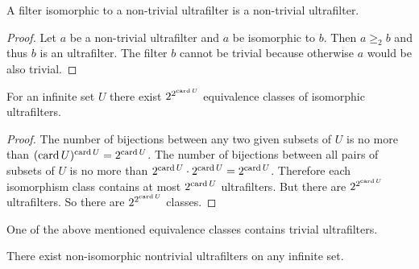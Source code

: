 \begin{prop}
A filter isomorphic to a non-trivial ultrafilter is a non-trivial
ultrafilter.\end{prop}
\begin{proof}
Let $a$ be a non-trivial ultrafilter and $a$ be isomorphic to $b$.
Then $a\ge_{2}b$ and thus $b$ is an ultrafilter. The filter $b$
cannot be trivial because otherwise $a$ would be also trivial.\end{proof}
\begin{thm}
For an infinite set $U$ there exist $2^{2^{\operatorname{card} U}}$ equivalence
classes of isomorphic ultrafilters.\end{thm}
\begin{proof}
The number of bijections between any two given subsets of $U$ is
no more than $(\operatorname{card} U)^{\operatorname{card} U}=2^{\operatorname{card} U}$. The number of bijections
between all pairs of subsets of $U$ is no more than $2^{\operatorname{card} U}\cdot2^{\operatorname{card} U}=2^{\operatorname{card} U}$.
Therefore each isomorphism class contains at most $2^{\operatorname{card} U}$ ultrafilters.
But there are $2^{2^{\operatorname{card} U}}$ ultrafilters. So there are $2^{2^{\operatorname{card} U}}$
classes.\end{proof}
\begin{rem}
One of the above mentioned equivalence classes contains trivial ultrafilters.\end{rem}
\begin{cor}
There exist non-isomorphic nontrivial ultrafilters on any infinite
set.
\end{cor}

